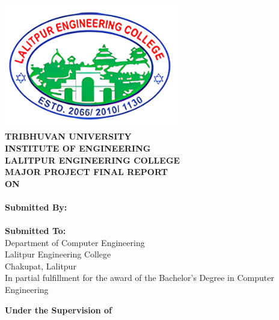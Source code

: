 \begin{center}
    \setlength{\parskip}{0pt}
    \linespread{1.6}
    \thispagestyle{empty}
    \includegraphics[width= 3in ]{img/leclogo21.png} \\
    \vspace{0.05 in}
    {\fontsize{12 pt}{12} \selectfont\textbf{TRIBHUVAN UNIVERSITY} \\
        \textbf{INSTITUTE OF ENGINEERING} \\
        \textbf{LALITPUR ENGINEERING COLLEGE}} \\

    \vspace{0.4 in}
    \textbf{MAJOR PROJECT FINAL REPORT}\\
    {\fontsize{12 pt}{12} \selectfont\textbf{ON}\\}
    {\fontsize{12 pt}{12} \selectfont \textbf{\thetitle}}\\
    \vspace{0.4in}
    \textbf{ Submitted By:}  \\
    {\theauthor} \\
    \vspace{0.3 in}
    \textbf{ Submitted To:}  \\
    Department of Computer Engineering \\
    Lalitpur Engineering College \\
    Chakupat, Lalitpur \\

    \vspace{0.3in}
    In partial fulfillment for the award of the
    Bachelor's Degree in Computer Engineering

    \vspace{0.2in}
    \textbf{Under the Supervision of} \\
    \thesupervisor\\
    \vspace{0.2in}
    \thedate

\end{center}
